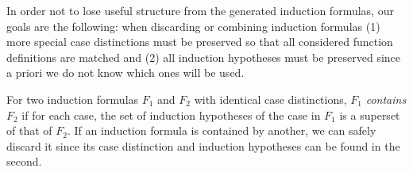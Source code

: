 In order not to lose useful structure from the generated induction formulas, our goals are the following: when discarding or combining induction formulas (1) more special case distinctions must be preserved so that all considered function definitions are matched and (2) all induction hypotheses must be preserved since a priori we do not know which ones will be used.

For two induction formulas $F_1$ and $F_2$ with identical case distinctions, $F_1$ \textit{contains} $F_2$ if for each case, the set of induction hypotheses of the case in $F_1$ is a superset of that of $F_2$. If an induction formula is contained by another, we can safely discard it since its case distinction and induction hypotheses can be found in the second.
\begin{example}
\end{example}

